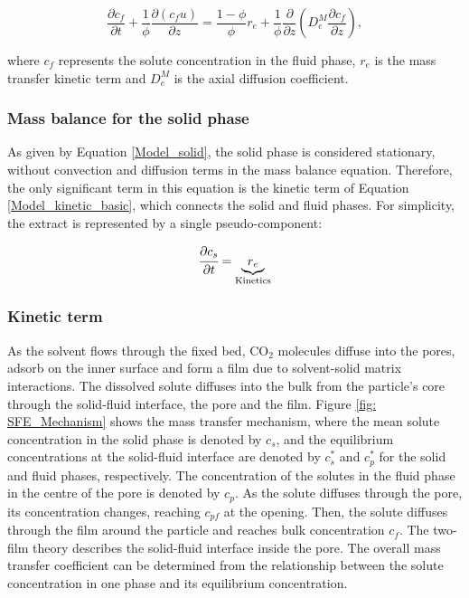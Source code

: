 \documentclass[a4paper,fleqn]{cas-dc}
\begin{document}
	{\footnotesize
		\begin{equation}
			\label{Model_fluid}
			\frac{\partial c_f}{\partial t}
			+ \frac{1}{\phi} \frac{\partial \left( c_f u\right)}{\partial z}
			= \frac{1-\phi}{\phi} r_e
			+ \frac{1}{\phi} \frac{\partial}{\partial z} \left( D^M_e \frac{\partial c_f}{\partial z} \right),
		\end{equation}
	}
	
	where $c_f$ represents the solute concentration in the fluid phase, $r_e$ is the mass transfer kinetic term and $D^M_e$ is the axial diffusion coefficient.
	
	\subsubsection{Mass balance for the solid phase} \label{Mass_balance_solid}
	
	As given by Equation \ref{Model_solid}, the solid phase is considered stationary, without convection and diffusion terms in the mass balance equation. Therefore, the only significant term in this equation is the kinetic term of Equation \ref{Model_kinetic_basic}, which connects the solid and fluid phases. For simplicity, the extract is represented by a single pseudo-component: 
	
	{\footnotesize
		\begin{equation} 
			\label{Model_solid}
			\cfrac{\partial c_s}{\partial t} = \underbrace{ r_e }_{\text{Kinetics}}
	\end{equation} }
	
	\subsubsection{Kinetic term} \label{CH: Kinetic}
	
	As the solvent flows through the fixed bed, CO$_2$ molecules diffuse into the pores, adsorb on the inner surface and form a film due to solvent-solid matrix interactions. The dissolved solute diffuses into the bulk from the particle's core through the solid-fluid interface, the pore and the film. Figure \ref{fig: SFE_Mechanism} shows the mass transfer mechanism, where the mean solute concentration in the solid phase is denoted by $c_s$, and the equilibrium concentrations at the solid-fluid interface are denoted by $c_s^*$ and $c_p^*$ for the solid and fluid phases, respectively. The concentration of the solutes in the fluid phase in the centre of the pore is denoted by $c_p$. As the solute diffuses through the pore, its concentration changes, reaching $c_{pf}$ at the opening. Then, the solute diffuses through the film around the particle and reaches bulk concentration $c_f$. The two-film theory describes the solid-fluid interface inside the pore. The overall mass transfer coefficient can be determined from the relationship between the solute concentration in one phase and its equilibrium concentration.
	
\end{document}
